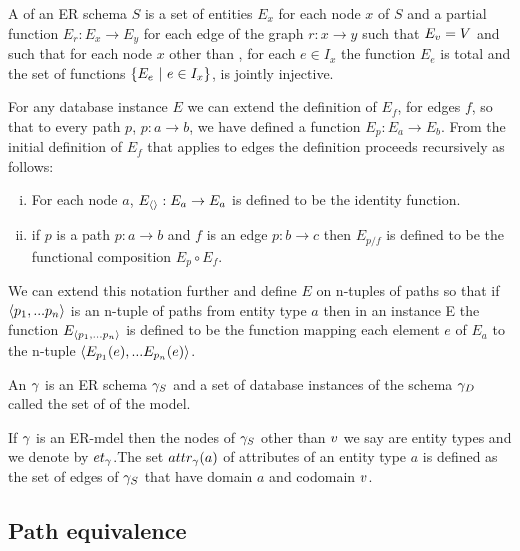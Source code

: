 \begin{definition}
\noindent A   of an ER schema $S$ is
a set of entities $E_x$ for each node $x$ of $S$ and 
a partial function $E_r : E_x \rightarrow E_y$ for each edge of the graph $r:x \rightarrow y$ 
such that $E_v=V$
and such that 
for each node $x$ other than \veee, for each $e \in I_x$ the function $E_e$ is total and
the set of functions $\left\{E_e \ \middle|\ e \in I_x\right\}$, is jointly injective.
\end{definition}

\noindent For any database instance $E$ we can  extend  the definition of
$E_f$, for edges $f$,  so that to every path $p$, $p: a \rightarrow b$,  we have defined a function $E_p: E_a \rightarrow E_b$. From the initial definition of $E_f$ that applies to 
edges the definition proceeds recursively as follows: 
\begin{enumerate} [(i)]
\item{  For each node $a$, $E_{\langle\rangle}: E_a \rightarrow E_a$ is defined to be the identity function.
}
\item{   if $p$ is a path $p: a \rightarrow b$ and $f$ is an edge $p: b \rightarrow c$ then $E_{p/f}$  
is defined to be the functional composition $E_p \circ E_f$. 
}
\end{enumerate}

We can extend this notation further and define $E$ on n-tuples of paths so that if 
$\langle p_1,...p_n\rangle$ is an n-tuple of paths from entity type $a$ then in an instance E
the function  $E_{\langle p_1,...p_n\rangle}$ is defined to be the function mapping each element $e$ 
of $E_a$ to the n-tuple
$\langle E_{p_1}(e),...E_{p_n}(e)\rangle$.

\begin{definition}
\noindent An  $\gamma$ is an ER schema $\gamma_S$ and a set of database instances of the schema $\gamma_D$ called the set of
 of the model. \\
\end{definition}

If $\gamma$ is an ER-mdel then the nodes of $\gamma_S$ other than $v$ we say are entity types and we denote by $et_{\gamma}$.The set $attr_{\gamma}(a)$ of attributes of an entity type $a$ is defined as the set of edges of $\gamma_S$ that have 
domain $a$  and  codomain $v$.

\subsection{Path equivalence}

